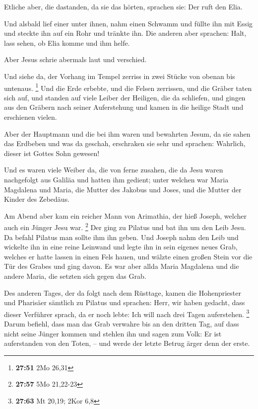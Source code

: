  Etliche aber, die dastanden, da sie das hörten, sprachen
sie: Der ruft den Elia.

 Und alsbald lief einer unter ihnen, nahm einen Schwamm
und füllte ihn mit Essig und steckte ihn auf ein Rohr und tränkte ihn.
 Die anderen aber sprachen: Halt, lass sehen, ob Elia
komme und ihm helfe.

 Aber Jesus schrie abermals laut und verschied.

 Und siehe da, der Vorhang im Tempel zerriss in zwei
Stücke von obenan bis untenaus. \footnote{\textbf{27:51} 2Mo 26,31}
 Und die Erde erbebte, und die Felsen zerrissen, und die
Gräber taten sich auf, und standen auf viele Leiber der Heiligen, die da
schliefen,  und gingen aus den Gräbern nach seiner
Auferstehung und kamen in die heilige Stadt und erschienen vielen.

 Aber der Hauptmann und die bei ihm waren und bewahrten
Jesum, da sie sahen das Erdbeben und was da geschah, erschraken sie sehr
und sprachen: Wahrlich, dieser ist Gottes Sohn gewesen!

 Und es waren viele Weiber da, die von ferne zusahen, die
da Jesu waren nachgefolgt aus Galiläa und hatten ihm gedient;
 unter welchen war Maria Magdalena und Maria, die Mutter
des Jakobus und Joses, und die Mutter der Kinder des Zebedäus.

 Am Abend aber kam ein reicher Mann von Arimathia, der
hieß Joseph, welcher auch ein Jünger Jesu war. \footnote{\textbf{27:57}
  5Mo 21,22-23}  Der ging zu Pilatus und bat ihn um den
Leib Jesu. Da befahl Pilatus man sollte ihm ihn geben. 
Und Joseph nahm den Leib und wickelte ihn in eine reine Leinwand
 und legte ihn in sein eigenes neues Grab, welches er
hatte lassen in einen Fels hauen, und wälzte einen großen Stein vor die
Tür des Grabes und ging davon.  Es war aber allda Maria
Magdalena und die andere Maria, die setzten sich gegen das Grab.

 Des anderen Tages, der da folgt nach dem Rüsttage, kamen
die Hohenpriester und Pharisäer sämtlich zu Pilatus  und
sprachen: Herr, wir haben gedacht, dass dieser Verführer sprach, da er
noch lebte: Ich will nach drei Tagen auferstehen. \footnote{\textbf{27:63}
  Mt 20,19; 2Kor 6,8}  Darum befiehl, dass man das Grab
verwahre bis an den dritten Tag, auf dass nicht seine Jünger kommen und
stehlen ihn und sagen zum Volk: Er ist auferstanden von den Toten, --
und werde der letzte Betrug ärger denn der erste.

